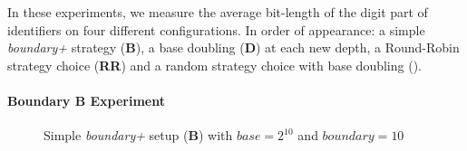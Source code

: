 In these experiments, we measure the average bit-length of the digit part of
identifiers on four different configurations. In order of appearance: a simple
\emph{boundary+} strategy (\textbf{B}), a base doubling (\textbf{D}) at each
new depth, a Round-Robin strategy choice (\textbf{RR}) and a random strategy
choice with base doubling (\textbf{\NAME}).

\paragraph{Boundary \textbf{B} Experiment}

\begin{figure}
\begin{center}
\small

\caption{Simple \emph{boundary+} setup (\textbf{B}) with $base=2^{10}$ and
  $boundary=10$}
\label{fig:dimlogexperiment}
\end{center}
\end{figure}

